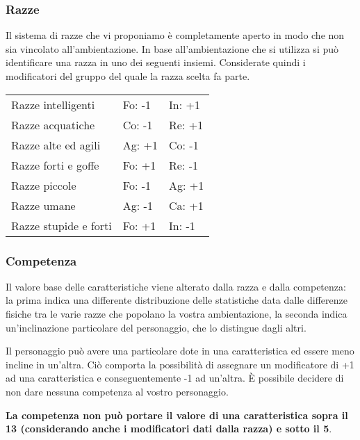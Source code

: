 \documentclass[../manuale_main.tex]{subfiles}
\begin{document}
\subsubsection{Razze}
Il sistema di razze che vi proponiamo è completamente aperto in modo che non sia vincolato all'ambientazione.
In base all’ambientazione che si utilizza si può identificare una razza in uno dei seguenti insiemi. Considerate quindi i modificatori del gruppo del quale la razza scelta fa parte.

\begin{tabular}{l l l}

Razze intelligenti&Fo: -1&In: +1\\

Razze acquatiche&Co: -1&Re: +1\\

 Razze alte ed agili&Ag: +1&Co: -1\\

Razze forti e goffe&Fo: +1&Re: -1\\

Razze piccole&Fo: -1&Ag: +1\\

Razze umane&Ag: -1&Ca: +1\\

Razze stupide e forti&Fo: +1&In: -1\\

\end{tabular}

\clearpage

\subsubsection{Competenza}

Il valore base delle caratteristiche viene alterato dalla razza e dalla competenza: la prima indica una differente distribuzione delle statistiche data dalle differenze fisiche tra le varie razze che popolano la vostra ambientazione, la seconda indica un'inclinazione particolare del personaggio, che lo distingue dagli altri.

Il personaggio può avere una particolare dote in una caratteristica ed essere meno incline in un'altra. 
Ciò comporta la possibilità di assegnare un modificatore di +1 ad una caratteristica e conseguentemente -1 ad un’altra. 
È possibile decidere di non dare nessuna competenza al vostro personaggio.

\textbf{La competenza non può portare il valore di una caratteristica sopra il 13 (considerando anche i modificatori dati dalla razza) e sotto il 5}. \\
\end{document}
